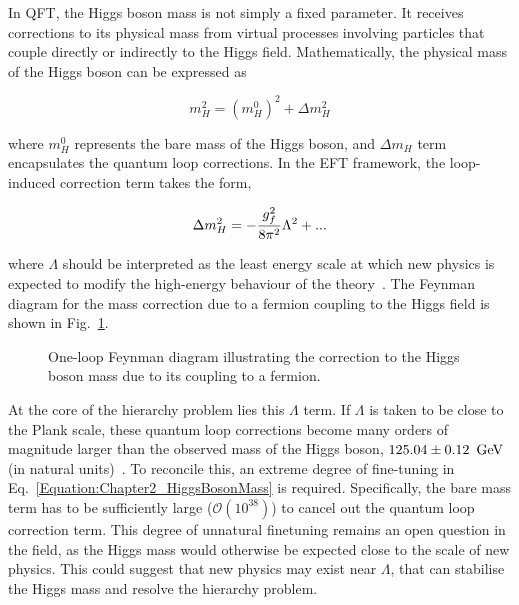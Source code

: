 In QFT, the Higgs boson mass is not simply a fixed parameter. It receives corrections to its physical mass from virtual processes involving particles that couple directly or indirectly to the Higgs field. Mathematically, the physical mass of the Higgs boson can be expressed as

\begin{equation}
    m_H^2 = (m_H^0)^2 + \Delta m_H^2
\label{Equation:Chapter2_HiggsBosonMass}
\end{equation}

where $m_H^0$ represents the bare mass of the Higgs boson, and $\Delta m_H$ term encapsulates the quantum loop corrections. In the EFT framework, the loop-induced correction term takes the form,

\begin{equation}
    \Delta m_H^2 = -\frac{g_f^2}{8\pi^2}\Lambda^2 + \space \text{...}
\end{equation}

where $\Lambda$ should be interpreted as the least energy scale at which new physics is expected to modify the high-energy behaviour of the theory~\cite{SUSY}. The Feynman diagram for the mass correction due to a fermion coupling to the Higgs field is shown in Fig.~\ref{Figure:Chapter2_Hierarchy_Feynman1}.

\begin{figure}[h]
\centering

\caption{One-loop Feynman diagram illustrating the correction to the Higgs boson mass due to its coupling to a fermion.}
\label{Figure:Chapter2_Hierarchy_Feynman1}
\end{figure}

At the core of the hierarchy problem lies this $\Lambda$ term. If $\Lambda$ is taken to be close to the Plank scale, these quantum loop corrections become many orders of magnitude larger than the observed mass of the Higgs boson, $125.04 \pm 0.12~\,\text{Ge\hspace{-.08em}V}$ (in natural units)~\cite{Higgs_Mass_Z4L}. To reconcile this, an extreme degree of fine-tuning in Eq.~\ref{Equation:Chapter2_HiggsBosonMass} is required. Specifically, the bare mass term has to be sufficiently large ($\mathcal{O}(10^{38})$) to cancel out the quantum loop correction term. This degree of unnatural finetuning remains an open question in the field, as the Higgs mass would otherwise be expected close to the scale of new physics. This could suggest that new physics may exist near $\Lambda$, that can stabilise the Higgs mass and resolve the hierarchy problem. 

